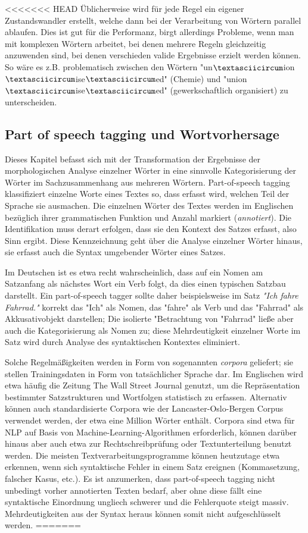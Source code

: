 \documentclass[12pt]{article}
\begin{document}
<<<<<<< HEAD
Üblicherweise wird für jede Regel ein eigener Zustandswandler erstellt, welche dann bei der Verarbeitung von Wörtern parallel ablaufen. Dies ist gut für die Performanz, birgt allerdings Probleme, wenn man mit komplexen Wörtern arbeitet, bei denen mehrere Regeln gleichzeitig anzuwenden sind, bei denen verschieden valide Ergebnisse erzielt werden können. So wäre es z.B. problematisch zwischen den Wörtern "un$\textasciicircum$ion$\textasciicircum$ise$\textasciicircum$ed" (Chemie) und "union$\textasciicircum$ise$\textasciicircum$ed" (gewerkschaftlich organisiert) zu unterscheiden. 

\subsection{Part of speech tagging und Wortvorhersage}
Dieses Kapitel befasst sich mit der Transformation der Ergebnisse der morphologischen Analyse einzelner Wörter in eine sinnvolle Kategorisierung der Wörter im Sachzusammenhang aus mehreren Wörtern. Part-of-speech tagging klassifiziert einzelne Worte eines Textes so, dass erfasst wird, welchen Teil der Sprache sie ausmachen. Die einzelnen Wörter des Textes werden im Englischen bezüglich ihrer grammatischen Funktion und Anzahl markiert (\textit{annotiert}). Die Identifikation muss derart erfolgen, dass sie den Kontext des Satzes erfasst, also Sinn ergibt. Diese Kennzeichnung geht über die Analyse einzelner Wörter hinaus, sie erfasst auch die Syntax umgebender Wörter eines Satzes. 

Im Deutschen ist es etwa recht wahrscheinlich, dass auf ein Nomen am Satzanfang als nächstes Wort ein Verb folgt, da dies einen typischen Satzbau darstellt. Ein part-of-speech tagger sollte daher beispielsweise im Satz \textit{"Ich fahre Fahrrad."} korrekt das "Ich" als Nomen, das "fahre" als Verb und das "Fahrrad" als Akkusativobjekt darstellen; Die isolierte "Betrachtung von "Fahrrad" ließe aber auch die Kategorisierung als Nomen zu; diese Mehrdeutigkeit einzelner Worte im Satz wird durch Analyse des syntaktischen Kontextes eliminiert.

Solche Regelmäßigkeiten werden in Form von sogenannten \textit{corpora} geliefert; sie stellen Trainingsdaten in Form von tatsächlicher Sprache dar. Im Englischen wird etwa häufig die Zeitung The Wall Street Journal genutzt, um die Repräsentation bestimmter Satzstrukturen und Wortfolgen statistisch zu erfassen. Alternativ können auch standardisierte Corpora wie der Lancaster-Oslo-Bergen Corpus verwendet werden, der etwa eine Million Wörter enthält. Corpora sind etwa für NLP auf Basis von Machine-Learning-Algorithmen erforderlich, können darüber hinaus aber auch etwa zur Rechtschreibprüfung oder Textunterteilung benutzt werden. Die meisten Textverarbeitungsprogramme können heutzutage etwa erkennen, wenn sich syntaktische Fehler in einem Satz ereignen (Kommasetzung, falscher Kasus, etc.). Es ist anzumerken, dass part-of-speech tagging nicht unbedingt vorher annotierten Texten bedarf, aber ohne diese fällt eine syntaktische Einordnung ungliech schwerer und die Fehlerquote steigt massiv. Mehrdeutigkeiten aus der Syntax heraus können somit nicht aufgeschlüsselt werden. 
=======
\end{document}
